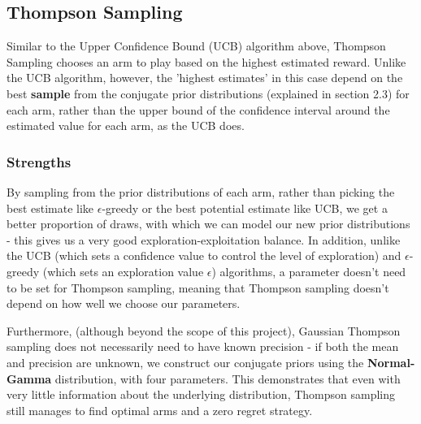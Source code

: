 \subsection{Thompson Sampling}\label{subsec:thompson-sampling}
Similar to the Upper Confidence Bound (UCB) algorithm above, Thompson Sampling chooses an arm to play based on the highest estimated reward.
Unlike the UCB algorithm, however, the 'highest estimates' in this case depend on the best \textbf{sample} from the conjugate prior distributions (explained in section 2.3) for each arm, rather than the upper bound of the confidence interval around the estimated value for each arm, as the UCB does.

\subsubsection{Strengths}
By sampling from the prior distributions of each arm, rather than picking the best estimate like $\epsilon$-greedy or the best potential estimate like UCB, we get a better proportion of draws, with which we can model our new prior distributions - this gives us a very good exploration-exploitation balance. In addition, unlike the UCB (which sets a confidence value to control the level of exploration) and $\epsilon$-greedy (which sets an exploration value $\epsilon$) algorithms, a parameter doesn't need to be set for Thompson sampling, meaning that Thompson sampling doesn't depend on how well we choose our parameters.

Furthermore, (although beyond the scope of this project), Gaussian Thompson sampling does not necessarily need to have known precision - if both the mean and precision are unknown, we construct our conjugate priors using the \textbf{Normal-Gamma} distribution, with four parameters. This demonstrates that even with very little information about the underlying distribution, Thompson sampling still manages to find optimal arms and a zero regret strategy.

